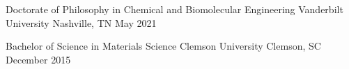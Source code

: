 
\begin{cventries}
    \cventry
    {Doctorate of Philosophy in Chemical and Biomolecular Engineering}
    {Vanderbilt University} %
    {Nashville, TN} %
    {May 2021} %
    {}

    \cventry
    {Bachelor of Science in Materials Science} %
    {Clemson University} %
    {Clemson, SC} %
    {December 2015} %
    {}
\end{cventries}
